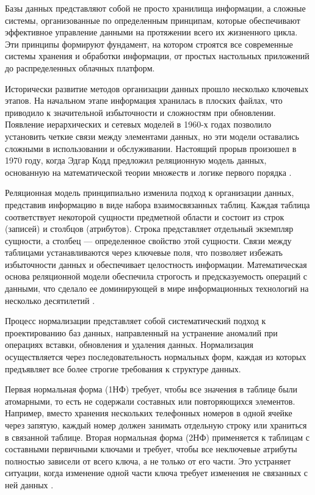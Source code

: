 \documentclass{SibFU-docs}
\begin{document}

Базы данных представляют собой не просто хранилища информации, а сложные системы, организованные по определенным принципам, которые обеспечивают эффективное управление данными на протяжении всего их жизненного цикла. Эти принципы формируют фундамент, на котором строятся все современные системы хранения и обработки информации, от простых настольных приложений до распределенных облачных платформ.


Исторически развитие методов организации данных прошло несколько ключевых этапов. На начальном этапе информация хранилась в плоских файлах, что приводило к значительной избыточности и сложностям при обновлении. Появление иерархических и сетевых моделей в 1960-х годах позволило установить четкие связи между элементами данных, но эти модели оставались сложными в использовании и обслуживании. Настоящий прорыв произошел в 1970 году, когда Эдгар Кодд предложил реляционную модель данных, основанную на математической теории множеств и логике первого порядка \cite{codd1970}.

Реляционная модель принципиально изменила подход к организации данных, представив информацию в виде набора взаимосвязанных таблиц. Каждая таблица соответствует некоторой сущности предметной области и состоит из строк (записей) и столбцов (атрибутов). Строка представляет отдельный экземпляр сущности, а столбец — определенное свойство этой сущности. Связи между таблицами устанавливаются через ключевые поля, что позволяет избежать избыточности данных и обеспечивает целостность информации. Математическая основа реляционной модели обеспечила строгость и предсказуемость операций с данными, что сделало ее доминирующей в мире информационных технологий на несколько десятилетий \cite{date2003}.


Процесс нормализации представляет собой систематический подход к проектированию баз данных, направленный на устранение аномалий при операциях вставки, обновления и удаления данных. Нормализация осуществляется через последовательность нормальных форм, каждая из которых предъявляет все более строгие требования к структуре данных.

Первая нормальная форма (1НФ) требует, чтобы все значения в таблице были атомарными, то есть не содержали составных или повторяющихся элементов. Например, вместо хранения нескольких телефонных номеров в одной ячейке через запятую, каждый номер должен занимать отдельную строку или храниться в связанной таблице. Вторая нормальная форма (2НФ) применяется к таблицам с составными первичными ключами и требует, чтобы все неключевые атрибуты полностью зависели от всего ключа, а не только от его части. Это устраняет ситуации, когда изменение одной части ключа требует изменения не связанных с ней данных \cite{elmasri2016}.
\end{document}
